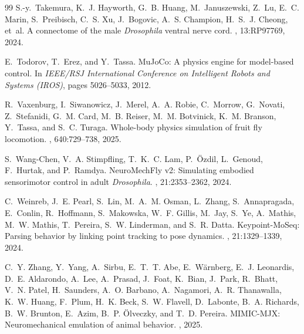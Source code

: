 \documentclass[10pt,twocolumn,letterpaper]{article}
\begin{document}
\begin{thebibliography}{99}
S.-y.~Takemura, K.~J. Hayworth, G.~B. Huang, M.~Januszewski, Z.~Lu, E.~C. Marin, S.~Preibisch, C.~S. Xu, J.~Bogovic, A.~S. Champion, H.~S.~J. Cheong, et~al.
\newblock A connectome of the male \emph{Drosophila} ventral nerve cord.
, 13:RP97769, 2024.

E.~Todorov, T.~Erez, and Y.~Tassa.
\newblock MuJoCo: A physics engine for model-based control.
\newblock In {\em IEEE/RSJ International Conference on Intelligent Robots and Systems (IROS)}, pages 5026--5033, 2012.

R.~Vaxenburg, I.~Siwanowicz, J.~Merel, A.~A. Robie, C.~Morrow, G.~Novati, Z.~Stefanidi, G.~M. Card, M.~B. Reiser, M.~M. Botvinick, K.~M. Branson, Y.~Tassa, and S.~C. Turaga.
\newblock Whole-body physics simulation of fruit fly locomotion.
, 640:729--738, 2025.

S.~Wang-Chen, V.~A. Stimpfling, T.~K.~C. Lam, P.~{\"O}zdil, L.~Genoud, F.~Hurtak, and P.~Ramdya.
\newblock NeuroMechFly v2: Simulating embodied sensorimotor control in adult \emph{Drosophila}.
, 21:2353--2362, 2024.

C.~Weinreb, J.~E. Pearl, S.~Lin, M.~A.~M. Osman, L.~Zhang, S.~Annapragada, E.~Conlin, R.~Hoffmann, S.~Makowska, W.~F. Gillis, M.~Jay, S.~Ye, A.~Mathis, M.~W. Mathis, T.~Pereira, S.~W. Linderman, and S.~R. Datta.
\newblock Keypoint-MoSeq: Parsing behavior by linking point tracking to pose dynamics.
, 21:1329--1339, 2024.

C.~Y. Zhang, Y.~Yang, A.~Sirbu, E.~T.~T. Abe, E.~W{\"a}rnberg, E.~J. Leonardis, D.~E. Aldarondo, A.~Lee, A.~Prasad, J.~Foat, K.~Bian, J.~Park, R.~Bhatt, V.~N. Patel, H.~Saunders, A.~O. Barbano, A.~Nagamori, A.~R. Thanawalla, K.~W. Huang, F.~Plum, H.~K. Beck, S.~W. Flavell, D.~Labonte, B.~A. Richards, B.~W. Brunton, E.~Azim, B.~P. {\"O}lveczky, and T.~D. Pereira.
\newblock MIMIC-MJX: Neuromechanical emulation of animal behavior.
, 2025.

\end{thebibliography}
\end{document}
